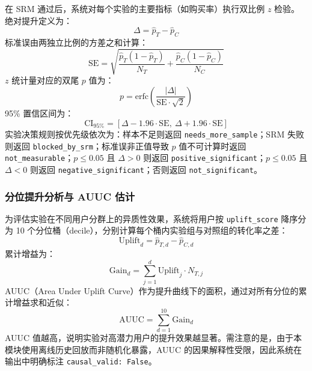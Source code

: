 在 SRM 通过后，系统对每个实验的主要指标（如购买率）执行双比例 $z$ 检验。绝对提升定义为：
\begin{equation}
    \Delta = \hat{p}_T - \hat{p}_C
    \label{eq:absolute-lift}
\end{equation}
标准误由两独立比例的方差之和计算：
\begin{equation}
    \text{SE} = \sqrt{\frac{\hat{p}_T(1 - \hat{p}_T)}{N_T} + \frac{\hat{p}_C(1 - \hat{p}_C)}{N_C}}
    \label{eq:standard-error}
\end{equation}
$z$ 统计量对应的双尾 $p$ 值为：
\begin{equation}
    p = \text{erfc}\left(\frac{|\Delta|}{\text{SE} \cdot \sqrt{2}}\right)
    \label{eq:z-test-p-value}
\end{equation}
95\% 置信区间为：
\begin{equation}
    \text{CI}_{95\%} = \left[\Delta - 1.96 \cdot \text{SE},\ \Delta + 1.96 \cdot \text{SE}\right]
    \label{eq:confidence-interval}
\end{equation}
实验决策规则按优先级依次为：样本不足则返回 \texttt{needs\_more\_sample}；SRM 失败则返回 \texttt{blocked\_by\_srm}；标准误非正值导致 $p$ 值不可计算时返回 \texttt{not\_measurable}；$p \leq 0.05$ 且 $\Delta > 0$ 则返回 \texttt{positive\_significant}；$p \leq 0.05$ 且 $\Delta < 0$ 则返回 \texttt{negative\_significant}；否则返回 \texttt{not\_significant}。

\subsubsection{分位提升分析与 AUUC 估计}

为评估实验在不同用户分群上的异质性效果，系统将用户按 \texttt{uplift\_score} 降序分为 10 个分位桶（decile），分别计算每个桶内实验组与对照组的转化率之差：
\begin{equation}
    \text{Uplift}_d = \hat{p}_{T,d} - \hat{p}_{C,d}
    \label{eq:decile-uplift}
\end{equation}
累计增益为：
\begin{equation}
    \text{Gain}_d = \sum_{j=1}^{d} \text{Uplift}_j \cdot N_{T,j}
    \label{eq:cumulative-gain}
\end{equation}
AUUC（Area Under Uplift Curve）作为提升曲线下的面积，通过对所有分位的累计增益求和近似：
\begin{equation}
    \text{AUUC} = \sum_{d=1}^{10} \text{Gain}_d
    \label{eq:auuc}
\end{equation}
AUUC 值越高，说明实验对高潜力用户的提升效果越显著。需注意的是，由于本模块使用离线历史回放而非随机化暴露，AUUC 的因果解释性受限，因此系统在输出中明确标注 \texttt{causal\_valid: False}。

